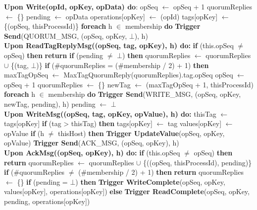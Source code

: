 \documentclass[sigconf]{acmart}
\begin{document}
\begin{algorithmic}[1]
\small

\State \textbf{Upon Write(opId, opKey, opData) do}:
\State \quad opSeq $\gets$ opSeq + 1
\State \quad quorumReplies $\gets$ \{\}
\State \quad pending $\gets$ opData
\State \quad operations[opKey] $\gets$ {(opId)}
\State \quad tags[opKey] $\gets$ \{(opSeq, thisProcessId)\}
\State \quad \textbf{foreach} h $\in$ membership \textbf{do}
\State \quad \quad \textbf{Trigger Send}(QUORUM\_MSG, (opSeq, opKey, $\bot$), h) \\

\State \textbf{Upon ReadTagReplyMsg((opSeq, tag, opKey), h) do:}
\State \quad \textbf{if} (this.opSeq $\neq$ opSeq) \textbf{then}
\State \quad \quad \textbf{return}
\State \quad \textbf{if} (pending $\neq$ $\bot$) \textbf{then}
\State \quad \quad quorumReplies $\gets$ quorumReplies $\cup$ \{(tag, $\bot$)\}
\State \quad \textbf{if} (\#quorumReplies = (\#membership / 2) + 1) \textbf{then}
\State \quad \quad maxTagOpSeq $\gets$ MaxTagQuorumReply(quorumReplies).tag.opSeq
\State \quad \quad opSeq $\gets$ opSeq + 1
\State \quad \quad quorumReplies $\gets$ \{\} 
\State \quad \quad newTag $\gets$ (maxTagOpSeq + 1, thisProcessId) 
\State \quad \quad \textbf{foreach} h $\in$ membership \textbf{do}
\State \quad \quad \quad \textbf{Trigger Send}(WRITE\_MSG, (opSeq, opKey, newTag, pending), h)
\State \quad \quad pending $\gets$ $\bot$ \\

\State \textbf{Upon WriteMsg((opSeq, tag, opKey, opValue), h) do:}
\State \quad thisTag $\gets$ tags[opKey]
\State \quad \textbf{if} (tag > thisTag) \textbf{then}
\State \quad \quad tags[opKey] $\gets$ tag
\State \quad \quad values[opKey] $\gets$ opValue
\State \quad \quad \textbf{if} (h $\neq$ thisHost) \textbf{then}
\State \quad \quad \quad \textbf{Trigger UpdateValue}(opSeq, opKey, opValue) 
\State \quad \textbf{Trigger Send}(ACK\_MSG, (opSeq, opKey), h)  \\

\State \textbf{Upon AckMsg((opSeq, opKey), h) do:}
\State \quad \textbf{if} (this.opSeq $\neq$ opSeq) \textbf{then}
\State \quad \quad \textbf{return}
\State \quad quorumReplies $\gets$ quorumReplies $\cup$ \{((opSeq, thisProcessId), pending)\}
\State \quad \textbf{if} (\#quorumReplies $\neq$ (\#membership / 2) + 1) \textbf{then}
\State \quad \quad \textbf{return}
\State \quad quorumReplies $\gets$ \{\}
\State \quad \textbf{if} (pending = $\bot$) \textbf{then}
\State \quad \quad \textbf{Trigger WriteComplete}(opSeq, opKey, values[opKey], operations[opKey])
\State \quad \textbf{else}
\State \quad \quad \textbf{Trigger ReadComplete}(opSeq, opKey, pending, operations[opKey]) \\
\end{algorithmic} \\
\end{document}
